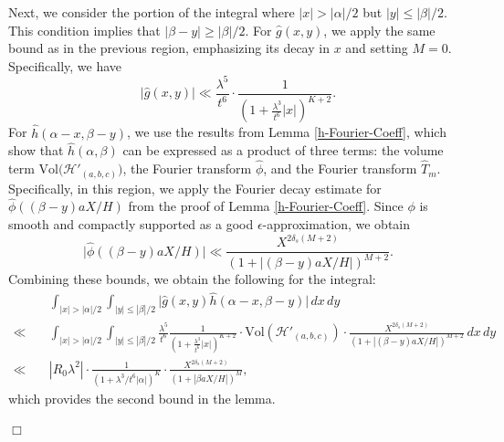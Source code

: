 \documentclass{article}
\def\H{{\mathcal H}}
\def\H{{\mathcal H}}
\newenvironment{proof}{\noindent {\bf Proof:}}{$\Box$ \vspace{2 ex}}
\begin{document}
\begin{proof}
Next, we consider the portion of the integral where $|x| > |\alpha|/2$ but $|y| \leq |\beta|/2$. This condition implies that $|\beta - y| \geq |\beta|/2$. For $\widehat{g}(x, y)$, we apply the same bound as in the previous region, emphasizing its decay in $x$ and setting $M = 0$. Specifically, we have  
\begin{equation*}
\Big|\widehat{g}(x, y)\Big| \ll \frac{\lambda^5}{t^6} \cdot \frac{1}{\left(1 + \frac{\lambda^3}{t^6} |x|\right)^{K+2}}.
\end{equation*}
For $\widehat{h}(\alpha - x, \beta - y)$, we use the results from Lemma \ref{h-Fourier-Coeff}, which show that $\widehat{h}(\alpha, \beta)$ can be expressed as a product of three terms: the volume term $\text{Vol}\big(\mathcal{H}'_{(a,b,c)}\big)$, the Fourier transform $\widehat{\phi}$, and the Fourier transform $\widehat{T}_m$. Specifically, in this region, we apply the Fourier decay estimate for $\widehat{\phi}((\beta - y) a X/ H)$ from the proof of Lemma \ref{h-Fourier-Coeff}. Since $\phi$ is smooth and compactly supported as a good $\epsilon$-approximation, we obtain  
\begin{equation*}
\Big|\widehat{\phi}((\beta - y) a X / H)\Big| \ll \frac{X^{2\delta_s (M+2)}}{(1 + |(\beta - y) a X / H|)^{M+2}}.
\end{equation*}
Combining these bounds, we obtain the following for the integral:
\begin{align*}
&\int_{|x| > |\alpha|/2} \int_{|y| \leq |\beta|/2} \big|\widehat{g}(x, y) \widehat{h}(\alpha - x, \beta - y)\big| \, dx \, dy \\ \ll \quad
&\int_{|x| > |\alpha|/2} \int_{|y| \leq |\beta|/2} \frac{\lambda^5}{t^6} \frac{1}{\left(1 + \frac{\lambda^3}{t^6} |x|\right)^{K+2}} \cdot \text{Vol}(\H'_{(a,b,c)}) \cdot \frac{X^{2\delta_s (M+2)}}{(1 + |(\beta - y) a X / H|)^{M+2}} \, dx \, dy \\ \ll\quad
& |R_0\lambda^2| \cdot\frac{1}{(1+\lambda^{3}/t^6|\alpha|)^K}\cdot \frac{X^{2\delta_s(M+2)}}{(1+ |\beta aX/H|)^M},
\end{align*}
which provides the second bound in the lemma.


\end{proof}
\end{document}
